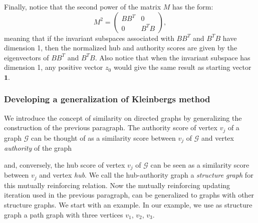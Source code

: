 \documentclass[a4paper,11pt]{report}
\newcommand{\graf}{\mathscr{G}}
\begin{document}
Finally, notice that the second power of the matrix $M$ has the form:
$$M^2 = \begin{pmatrix} 
BB^T & 0\\
0 & B^TB
\end{pmatrix},$$
meaning that if the invariant subspaces associated with $BB^T$ and $B^TB$ have 
dimension 1, then the normalized hub and authority scores are given by the 
eigenvectors of $BB^T$ and $B^TB$. Also notice that when the invariant subspace 
has dimension 1, any positive vector $z_0$ would give the same result as 
starting vector $\mathbf{1}$.

\subsubsection{Developing a generalization of Kleinbergs method}
We introduce the concept of similarity on directed graphs by generalizing the 
construction of the previous paragraph. The authority score of vertex $v_j$ of a 
graph $\graf$ can be thought of as a similarity score between $v_j$ of $\graf$ 
and vertex \emph{authority} of the graph

\begin{center}
\end{center}
and, conversely, the hub score of vertex $v_j$ of $\graf$ can be seen as a similarity 
score between $v_j$ and vertex \emph{hub}. We call the hub-authority graph a 
\emph{structure graph} for this mutually reinforcing relation. Now the mutually reinforcing updating iteration used in 
the previous paragraph, can be generalized to graphs with other structure 
graphs. We start with an example. In our example, we use as structure graph a path graph with three vertices $v_1$, $v_2$, $v_3$. 
\end{document}
